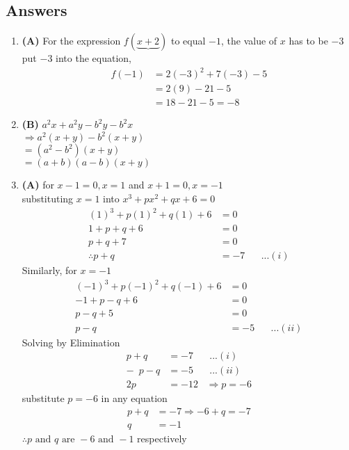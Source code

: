 \subsection{Answers}
\begin{multicols}{2}
\begin{enumerate}[label={\textbf{\arabic*.}}]
\item \textbf{(A)} For the expression $f(\underbrace{x + 2})$ to equal $-1$, the value of  $x$ has to be $-3$ \\ 
put $-3$ into the equation,   
    \begin{align*}
     f(-1) &= 2(-3)^2 + 7(-3) - 5 \\
     &= 2(9) - 21 - 5 \\
     &= 18 - 21 - 5 = -8
    \end{align*}
\item \textbf{(B)} $a^2x + a^2y - b^2y - b^2x $ \\
        $\Rightarrow a^2(x + y) -b^2(x + y) $ \\
        $= (a^2 - b^2)(x + y) $ \\
        $=(a + b)(a - b) (x + y)$
\item \textbf{(A)} for $x-1 = 0, x = 1 $ and $ x+1=0, x = -1$ \\
    substituting $x = 1$ into $x^3 + px^2 + qx + 6 = 0$ 
    \begin{align*}
    (1)^3 + p(1)^2 + q(1) + 6 &= 0 \\
    1+ p + q + 6 &= 0 \\
    p + q + 7 &= 0 \\
    \therefore p + q &= -7 \hspace{20pt} ...(i)
    \end{align*}
    Similarly, for $x = -1$
    \begin{align*}
        (-1)^3 + p(-1)^2 + q(-1) + 6 &= 0 \\
        -1+ p - q + 6 &= 0 \\
        p - q + 5 &= 0 \\
       p - q &= -5 \hspace{20pt} ...(ii)
        \end{align*}
    Solving by Elimination
    \begin{align*}
        p + q &= -7 \hspace{20pt} ...(i)\\
       -\hspace{6pt} p - q &= -5  \hspace{20pt} ...(ii)\\
        2p &= -12 \hspace{10pt} \Rightarrow  p = -6
    \end{align*}
    substitute $p = -6$ in any equation 
    \begin{align*} 
        p + q &= -7
        \Rightarrow -6 + q = -7 \\
        q &=  -1
    \end{align*}
    $\therefore p \text{ and } q \text{ are } -6 \text{ and } -1$ respectively
    


\end{enumerate}
\end{multicols}
